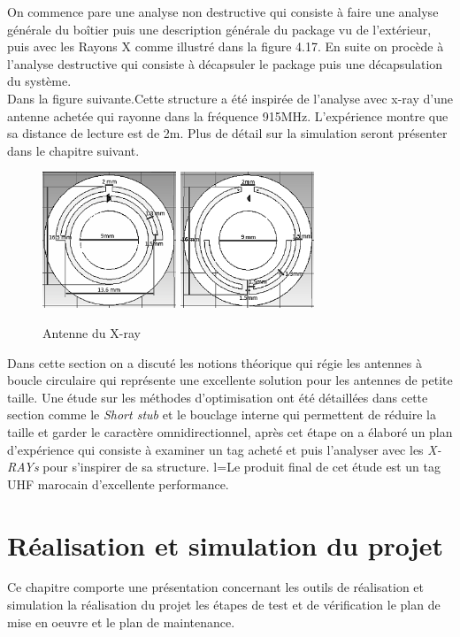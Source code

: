 \documentclass[11pt, a4paper, twoside]{book}
\begin{document}
On commence pare une analyse non destructive qui consiste à faire une analyse générale du boîtier puis une description générale du package vu de l’extérieur, puis avec les Rayons X comme illustré dans la figure 4.17. En suite on procède à l'analyse destructive qui consiste à décapsuler le package puis une décapsulation du système.\\

Dans la figure suivante.Cette structure a été inspirée de l'analyse avec x-ray d'une antenne achetée qui rayonne dans la fréquence 915MHz. L'expérience montre que sa distance de lecture est de 2m. Plus de détail sur la simulation seront présenter dans le chapitre suivant.\\

\begin{figure}[H]
\centering
\includegraphics[width=4cm]{front11}
\includegraphics[width=4cm]{back22}
\caption{Antenne du X-ray}
\end{figure}

Dans cette section on a discuté les notions théorique qui régie les antennes à boucle circulaire qui représente une excellente solution pour les antennes de petite taille. Une étude sur les méthodes d'optimisation ont été détaillées dans cette section comme le \emph{Short stub} et le bouclage interne qui permettent de réduire la taille et garder le caractère omnidirectionnel, après cet étape on a élaboré un plan d'expérience qui consiste à examiner un tag acheté et puis l'analyser avec les \emph{X-RAYs} pour s'inspirer de sa structure. l=Le produit final de cet étude est un tag UHF marocain d'excellente performance.

\chapter{Réalisation et simulation du projet}
Ce chapitre comporte une présentation concernant 
les outils de réalisation et simulation 
la réalisation du projet
les étapes de test et de vérification 
le plan de mise en oeuvre et le plan de maintenance.
\end{document}
